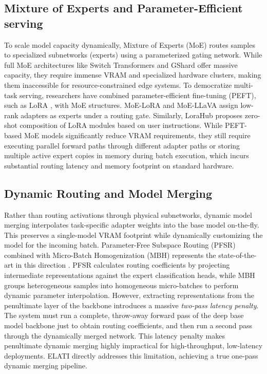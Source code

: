 \subsection{Mixture of Experts and Parameter-Efficient serving}
To scale model capacity dynamically, Mixture of Experts (MoE) \cite{shazeer17moe, wang24moesurvey} routes samples to specialized subnetworks (experts) using a parameterized gating network.
While full MoE architectures like Switch Transformers \cite{fedus21switch} and GShard \cite{lepikhin20gshard} offer massive capacity, they require immense VRAM and specialized hardware clusters, making them inaccessible for resource-constrained edge systems.
To democratize multi-task serving, researchers have combined parameter-efficient fine-tuning (PEFT), such as LoRA \cite{hu21lora, mangrulkar22peft}, with MoE structures.
MoE-LoRA \cite{dou23moelora} and MoE-LLaVA \cite{liu24moellava} assign low-rank adapters as experts under a routing gate.
Similarly, LoraHub \cite{huang23lorahub} proposes zero-shot composition of LoRA modules based on user instructions.
While PEFT-based MoE models significantly reduce VRAM requirements, they still require executing parallel forward paths through different adapter paths or storing multiple active expert copies in memory during batch execution, which incurs substantial routing latency and memory footprint on standard hardware.

\subsection{Dynamic Routing and Model Merging}
Rather than routing activations through physical subnetworks, dynamic model merging interpolates task-specific adapter weights into the base model on-the-fly.
This preserves a single-model VRAM footprint while dynamically customizing the model for the incoming batch.
Parameter-Free Subspace Routing (PFSR) combined with Micro-Batch Homogenization (MBH) represents the state-of-the-art in this direction \cite{chronopoulou23representation, zhang24survey}.
PFSR calculates routing coefficients by projecting intermediate representations against the expert classification heads, while MBH groups heterogeneous samples into homogeneous micro-batches to perform dynamic parameter interpolation.
However, extracting representations from the penultimate layer of the backbone introduces a massive \emph{two-pass latency penalty}.
The system must run a complete, throw-away forward pass of the deep base model backbone just to obtain routing coefficients, and then run a second pass through the dynamically merged network.
This latency penalty makes penultimate dynamic merging highly impractical for high-throughput, low-latency deployments.
ELATI directly addresses this limitation, achieving a true one-pass dynamic merging pipeline.

